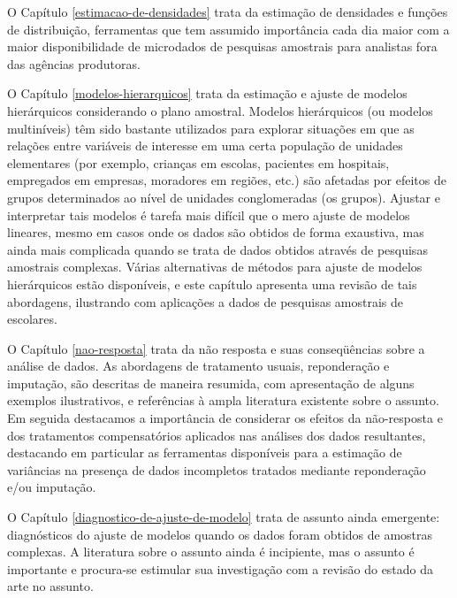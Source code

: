 \documentclass[]{book}
\theoremstyle{definition}
\theoremstyle{definition}
\theoremstyle{definition}
\theoremstyle{remark}
\begin{document}
O Capítulo \ref{estimacao-de-densidades} trata da estimação de
densidades e funções de distribuição, ferramentas que tem assumido
importância cada dia maior com a maior disponibilidade de microdados de
pesquisas amostrais para analistas fora das agências produtoras.

O Capítulo \ref{modelos-hierarquicos} trata da estimação e ajuste de
modelos hierárquicos considerando o plano amostral. Modelos hierárquicos
(ou modelos multiníveis) têm sido bastante utilizados para explorar
situações em que as relações entre variáveis de interesse em uma certa
população de unidades elementares (por exemplo, crianças em escolas,
pacientes em hospitais, empregados em empresas, moradores em regiões,
etc.) são afetadas por efeitos de grupos determinados ao nível de
unidades conglomeradas (os grupos). Ajustar e interpretar tais modelos é
tarefa mais difícil que o mero ajuste de modelos lineares, mesmo em
casos onde os dados são obtidos de forma exaustiva, mas ainda mais
complicada quando se trata de dados obtidos através de pesquisas
amostrais complexas. Várias alternativas de métodos para ajuste de
modelos hierárquicos estão disponíveis, e este capítulo apresenta uma
revisão de tais abordagens, ilustrando com aplicações a dados de
pesquisas amostrais de escolares.

O Capítulo \ref{nao-resposta} trata da não resposta e suas conseqüências
sobre a análise de dados. As abordagens de tratamento usuais,
reponderação e imputação, são descritas de maneira resumida, com
apresentação de alguns exemplos ilustrativos, e referências à ampla
literatura existente sobre o assunto. Em seguida destacamos a
importância de considerar os efeitos da não-resposta e dos tratamentos
compensatórios aplicados nas análises dos dados resultantes, destacando
em particular as ferramentas disponíveis para a estimação de variâncias
na presença de dados incompletos tratados mediante reponderação e/ou
imputação.

O Capítulo \ref{diagnostico-de-ajuste-de-modelo} trata de assunto ainda
emergente: diagnósticos do ajuste de modelos quando os dados foram
obtidos de amostras complexas. A literatura sobre o assunto ainda é
incipiente, mas o assunto é importante e procura-se estimular sua
investigação com a revisão do estado da arte no assunto.
\end{document}
